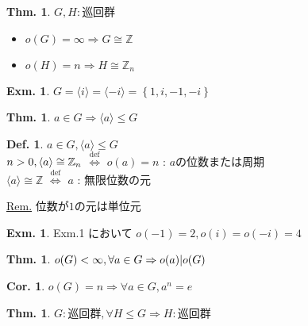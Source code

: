 \documentclass[uplatex,dvipdfmx,9pt]{beamer}
\newcommand{\defarrow}{\overset{\mathrm{def}}{\Leftrightarrow}}
\newcommand{\lt}{\ensuremath <}
\newcommand{\gt}{\ensuremath >}
\newcommand{\generator}[1]{\langle#1\rangle}
\newcounter{textThmCount}
\newcounter{textExmCount}
\theoremstyle{definition} %
\newtheorem{defn}{Def.}[subsection] %
\newtheorem{thm}{Thm.}[subsection] %
\newtheorem{thmText}[textThmCount]{Thm.}
\newtheorem{corText}{Cor.}[textThmCount] %
\theoremstyle{example}
\newtheorem{exmText}[textExmCount]{Exm.}
\begin{document}
      \begin{frame}

        \begin{thmText}
          $G, H: \text{巡回群}$
          \begin{itemize}
            \item $o(G) = \infty \Rightarrow G \cong \mathbb{Z}$
            \item $o(H) = n \Rightarrow H \cong \mathbb{Z}_n$
          \end{itemize}
        \end{thmText}

        \begin{exmText}
          $G = \generator{i} = \generator{-i} = \left\{1, i, -1, -i\right\}$
        \end{exmText}

        \begin{thm}
          $a \in G \Rightarrow \generator{a} \le G$
        \end{thm}

        \begin{defn}
          $a \in G, \generator{a} \le G$ \\
          $n \gt 0, \generator{a} \cong \mathbb{Z}_n$ $\defarrow$ $o(a) = n$ : $a$の\alert{位数}または\alert{周期} \\
          $\generator{a} \cong \mathbb{Z}$ $\defarrow$ $a$ : \alert{無限位数}の元
        \end{defn}
        \underline{Rem.} 位数が$1$の元は単位元

      \end{frame}

      \begin{frame}

        \begin{exmText}
          Exm.1 において $o(-1) = 2, o(i) = o(-i) = 4$
        \end{exmText}
        
        \begin{thmText}
          $o(G) \lt \infty, \forall a \in G \Rightarrow o(a)|o(G)$
        \end{thmText}

        \begin{corText}
          $o(G) = n \Rightarrow \forall a \in G, a^n = e$
        \end{corText}

        \begin{thmText}
          $G: \text{巡回群}, \forall H \le G \Rightarrow H: \text{巡回群}$
        \end{thmText}

      \end{frame}
\end{document}
